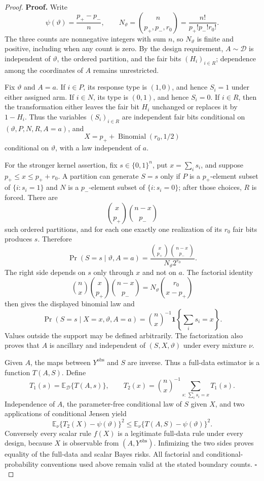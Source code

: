 \documentclass{article}
\begin{document}
\begin{proof}
\textbf{Proof.}
Write
\[
 \psi(\vartheta)=\frac{p_+-p_-}{n},
 \qquad
 N_\vartheta=\binom{n}{p_+,p_-,r_0}
 =\frac{n!}{p_+!p_-!r_0!}.
\]
The three counts are nonnegative integers with sum \(n\), so \(N_\vartheta\) is finite and positive, including when any count is zero. By the design requirement, \(A\sim\mathcal D\) is independent of \(\vartheta\), the ordered partition, and the fair bits \((H_i)_{i\in R}\); dependence among the coordinates of \(A\) remains unrestricted.

Fix \(\vartheta\) and \(A=a\). If \(i\in P\), its response type is \((1,0)\), and hence \(S_i=1\) under either assigned arm. If \(i\in N\), its type is \((0,1)\), and hence \(S_i=0\). If \(i\in R\), then the transformation either leaves the fair bit \(H_i\) unchanged or replaces it by \(1-H_i\). Thus the variables \((S_i)_{i\in R}\) are independent fair bits conditional on \((\vartheta,P,N,R,A=a)\), and
\[
 X=p_++\operatorname{Binomial}(r_0,1/2)
\]
conditional on \(\vartheta\), with a law independent of \(a\).

For the stronger kernel assertion, fix \(s\in\{0,1\}^n\), put \(x=\sum_i s_i\), and suppose \(p_+\leq x\leq p_++r_0\). A partition can generate \(S=s\) only if \(P\) is a \(p_+\)-element subset of \(\{i:s_i=1\}\) and \(N\) is a \(p_-\)-element subset of \(\{i:s_i=0\}\); after those choices, \(R\) is forced. There are
\[
 \binom{x}{p_+}\binom{n-x}{p_-}
\]
such ordered partitions, and for each one exactly one realization of its \(r_0\) fair bits produces \(s\). Therefore
\[
 \Pr(S=s\mid\vartheta,A=a)
 =\frac{\binom{x}{p_+}\binom{n-x}{p_-}}
 {N_\vartheta2^{r_0}}.
\]
The right side depends on \(s\) only through \(x\) and not on \(a\). The factorial identity
\[
 \binom nx\binom{x}{p_+}\binom{n-x}{p_-}
 =N_\vartheta\binom{r_0}{x-p_+}
\]
then gives the displayed binomial law and
\[
 \Pr(S=s\mid X=x,\vartheta,A=a)
 =\binom nx^{-1}\mathbf 1\!\left\{\sum_i s_i=x\right\}.
\]
Values outside the support may be defined arbitrarily. The factorization also proves that \(A\) is ancillary and independent of \((S,X,\vartheta)\) under every mixture \(\nu\).

Given \(A\), the maps between \(Y^{\mathrm{obs}}\) and \(S\) are inverse. Thus a full-data estimator is a function \(T(A,S)\). Define
\[
 T_1(s)=\mathbb E_\mathcal D\{T(A,s)\},
 \qquad
 T_2(x)=\binom nx^{-1}\sum_{s:\,\sum_i s_i=x}T_1(s).
\]
Independence of \(A\), the parameter-free conditional law of \(S\) given \(X\), and two applications of conditional Jensen yield
\[
 \mathbb E_\nu\{T_2(X)-\psi(\vartheta)\}^2
 \leq \mathbb E_\nu\{T(A,S)-\psi(\vartheta)\}^2.
\]
Conversely every scalar rule \(f(X)\) is a legitimate full-data rule under every design, because \(X\) is observable from \((A,Y^{\mathrm{obs}})\). Infimizing the two sides proves equality of the full-data and scalar Bayes risks. All factorial and conditional-probability conventions used above remain valid at the stated boundary counts. \(\square\)
\end{proof}
\end{document}
